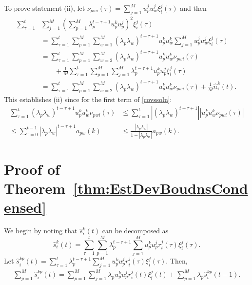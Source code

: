 \documentclass[final,5p,times,twocolumn]{elsarticle}
\theoremstyle{definition}
\begin{document}
To prove statement (ii), let $\nu_{pwi}(\tau) \!=\! \sum_{j=1}^M u_p^j u_w^j \xi_i^j(\tau)$ and then 
\begin{align}
\sum_{\tau=1}^{t} &\sum_{j=1}^M \left(\sum_{p=1}^M \lambda_p^{t-\tau+1}  u_p^k u_p^j  \right)^2 \xi_i^j(\tau) \nonumber \\
& = \sum_{\tau=1}^t \sum_{p=1}^M \sum_{w=1}^M (\lambda_p \lambda_w)^{t-\tau+1} u_p^k u_w^k \sum_{j=1}^M u_p^j u_w^j \xi_i^j(\tau) \nonumber \\
& = \sum_{\tau=1}^t \sum_{p=1}^M \sum_{w=2}^M (\lambda_p \lambda_w)^{t-\tau+1} u_p^k u_w^k \nu_{pwi}(\tau) \nonumber \\
& \quad \quad + \frac{1}{M} \sum_{\tau=1}^t \sum_{p=1}^M  \sum_{j=1}^M \lambda_p^{t-\tau+1} u_p^k u_p^j \xi_i^j(\tau) \nonumber \\
& = \sum_{\tau=1}^t \sum_{p=1}^M \sum_{w=2}^M (\lambda_p \lambda_w)^{t-\tau+1} u_p^k u_w^k \nu_{pwi}(\tau) +\frac{1}{M} \hat{n}_i^k(t). \label{covssoln}
\end{align}
This establishes (ii) since for the first term of \eqref{covssoln}:
\begin{align*}
\sum_{\tau=1}^t  (\lambda_p \lambda_w)^{t-\tau+1} u_p^k u_w^k \nu_{pwi}(\tau) %
&  
\leq \sum_{\tau=1}^t  |(\lambda_p \lambda_w)^{t-\tau+1} || u_p^k u_w^k \nu_{pwi}(\tau) | \nonumber \\ 
\leq  \sum_{\tau = 0}^{t-1}   |\lambda_p \lambda_w|^{t-\tau+1} a_{pw}(k) %
&
\leq   \frac{|\lambda_p \lambda_w|}{1-|\lambda_p \lambda_w|}  a_{pw}(k). \label{cov1stmid}
\end{align*}



\section{Proof of Theorem~\ref{thm:EstDevBoudnsCondensed}}\label{app:proof-thm-1}

We begin by noting that $\hat{s}_i^k(t)$ can be decomposed as 
	\begin{equation}
		\hat{s}_i^k(t) = \sum_{\tau=1}^{t} \sum_{p=1}^{M} \lambda_p^{t-\tau+1} \sum_{j=1}^M u_p^k u_p^j r_i^j(\tau) \xi_i^j(\tau). \label{eqn:s_i_hat_defn}
	\end{equation}
	Let $\hat{s}_i^{kp}(t) =  \sum_{\tau=1}^{t} \lambda_p^{t-\tau+1} \sum_{j=1}^M u_p^k u_p^j r_i^j(\tau) \xi_i^j(\tau)$.  Then, 
	\begin{align}
		\sum_{p=1}^M \hat{s}_i^{kp}(t)  =   \sum_{p=1}^{M} \sum_{j=1}^M \lambda_p u_p^k u_p^j r_i^j(t) \xi_i^j(t) + \sum_{p=1}^M \lambda_p \hat{s}_i^{kp}(t-1). \label{eqn:shat_modaldecomp}
	\end{align}
\end{document}

